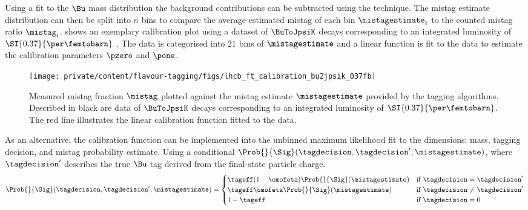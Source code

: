 Using a fit to the $\Bu$ mass distribution the background contributions can be
subtracted using the \sPlot technique. The mistag estimate distribution can then
be split into $n$ bins to compare the average estimated mistag of each bin
$\mistagestimate_i$ to the counted mistag ratio $\mistag_i$.
 shows an
exemplary calibration plot using a dataset of $\BuToJpsiK$ decays corresponding
to an integrated luminosity of $\SI{0.37}{\per\femtobarn}$ \cite{Aaij:2012mu}.
The data is categorised into $\num{21}$ bins of $\mistagestimate$ and a linear
function is fit to the data to estimate the calibration parameters $\pzero$ and
$\pone$.
%
\begin{figure}
\centering
\texttt{[image: private/content/flavour-tagging/figs/lhcb\_ft\_calibration\_bu2jpsik\_037fb]}
\caption{Measured mistag fraction $\mistag$ plotted against the mistag estimate
$\mistagestimate$ provided by the tagging algorithms. Described in black are
data of $\BuToJpsiK$ decays corresponding to an integrated luminosity of
$\SI{0.37}{\per\femtobarn}$. The red line illustrates the linear calibration
function fitted to the data. \cite{Aaij:2012mu}}
\label{fig:flavour_tagging:calibration:method:charged:calibration_plot}
\end{figure}

As an alternative, the calibration function can be implemented into the unbinned
maximum likelihood fit to the dimensions: mass, tagging decision, and mistag
probability estimate. Using a conditional \PDF
$\Prob{}{\Sig}(\tagdecision,\tagdecision^\prime,\mistagestimate)$, where
$\tagdecision^\prime$ describes the true $\Bu$ tag derived from the final-state
particle charge.
%
\begin{equation}\label{eq:flavour_tagging:calibration:method:charged:tagdefinition}
  \Prob{}{\Sig}(\tagdecision,\tagdecision^\prime,\mistagestimate) = 
  \begin{cases}
        \tageff (1-\omofeta) \Prob{}{\Sig}(\mistagestimate)    & \text{if $\tagdecision =    \tagdecision^\prime$} \\
        \tageff    \omofeta  \Prob{}{\Sig}(\mistagestimate)    & \text{if $\tagdecision \neq \tagdecision^\prime$} \\
    1 - \tageff                                                & \text{if $\tagdecision = 0$} \\
  \end{cases}
\end{equation}
%

